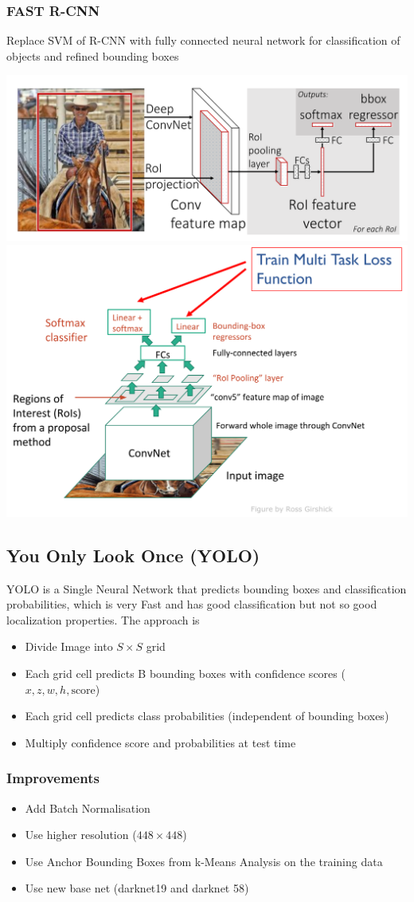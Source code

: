 \subsubsection{FAST R-CNN}
Replace SVM of R-CNN with fully connected neural network for classification of objects and refined bounding boxes
\begin{center}
	\includegraphics[width=0.7\linewidth]{img/fast_r-cnn_structure}
	\includegraphics[width=0.7\linewidth]{img/fast_r-cnn_structure2}
\end{center}

\subsection{You Only Look Once (YOLO)}
YOLO is a Single Neural Network that predicts bounding boxes and classification probabilities,
which is very Fast and has good classification but not so good localization properties. The approach is
\begin{itemize}[label=-,nosep]
	\item Divide Image into $S \times S$ grid
	\item Each grid cell predicts B bounding boxes with confidence scores ($x, z, w, h, \text{score}$)
	\item Each grid cell predicts class probabilities (independent of bounding boxes)
	\item Multiply confidence score and probabilities at test time
\end{itemize}

\subsubsection{Improvements}
\begin{itemize}[label=-]
	\item Add Batch Normalisation
	\item Use higher resolution ($448\times 448$)
	\item Use Anchor Bounding Boxes from k-Means Analysis on the training data
	\item Use new base net (darknet19 and darknet 58)
\end{itemize}

